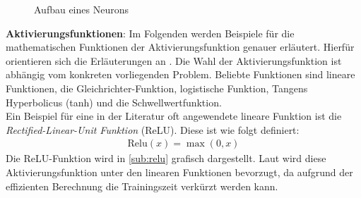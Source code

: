 \documentclass[12pt,a4paper,bibliography=totocnumbered,listof=totocnumbered]{article}
\begin{document}
\begin{figure}[h]
\centering
{}
\caption{Aufbau eines Neurons \citep[In Anlehnung an][S. 192]{UweLammel.2020}}
\label{abb:neuron}
\end{figure}
\textbf{Aktivierungsfunktionen}: Im Folgenden werden Beispiele für die mathematischen Funktionen der Aktivierungsfunktion genauer erläutert. Hierfür orientieren sich die Erläuterungen an \citep[S. 193 ff.]{UweLammel.2020}.
Die Wahl der Aktivierungsfunktion ist abhängig vom konkreten vorliegenden Problem. Beliebte Funktionen sind lineare Funktionen, die Gleichrichter-Funktion, logistische Funktion, Tangens Hyperbolicus (tanh) und die Schwellwertfunktion.\\
Ein Beispiel für eine in der Literatur oft angewendete lineare Funktion ist die \emph{Rectified-Linear-Unit Funktion} (ReLU). Diese ist wie folgt definiert: 
\begin{align}
\text{Relu}(x) = \max (0,x)
\end{align}
Die ReLU-Funktion wird in \autoref{sub:relu} grafisch dargestellt. Laut \citep[S.118]{Krohn.2020} wird diese Aktivierungsfunktion unter den linearen Funktionen bevorzugt, da aufgrund der effizienten Berechnung die Trainingszeit verkürzt werden kann.\\
\end{document}
